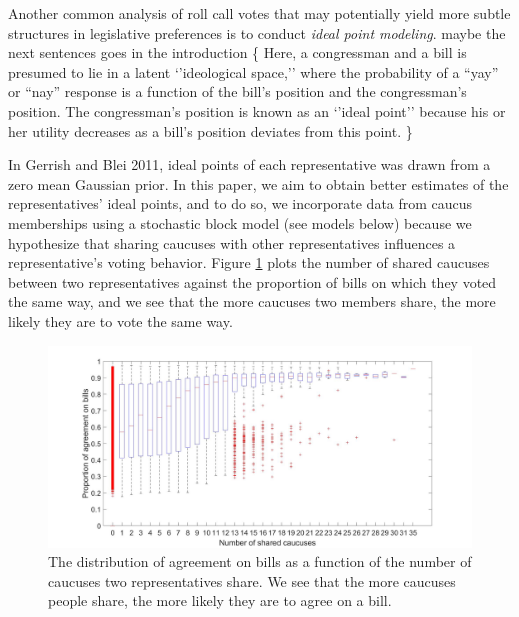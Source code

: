 \documentclass{article}
\begin{document}
Another common analysis of roll call votes that may potentially yield more subtle structures in legislative preferences is to conduct {\itshape ideal point modeling}. {\color{red} maybe the next sentences goes in the introduction \{} Here, a congressman and a bill is presumed to lie in a latent `'ideological space,'' where the probability of a ``yay'' or ``nay'' response is a function of the bill's position and the congressman's position. The congressman's position is known as an `'ideal point'' because his or her utility decreases as a bill's position deviates from this point. {\color{red} \}}

In Gerrish and Blei 2011, ideal points of each representative was drawn from a zero mean Gaussian prior. In this paper, we aim to obtain better estimates of the representatives' ideal points, and to do so, we incorporate data from caucus memberships using a stochastic block model (see models below) because we hypothesize that sharing caucuses with other representatives influences a representative's voting behavior. Figure \ref{fig:VotesVsCaucus} plots the number of shared caucuses between two representatives against the proportion of bills on which they voted the same way, and we see that the more caucuses two members share, the more likely they are to vote the same way. 

\begin{figure}[h]
  \centering
        \includegraphics[width=\textwidth]{Caucus_vs_Votes.jpg}
  \caption{The distribution of agreement on bills as a function of the number of caucuses two representatives share. We see that the more caucuses people share, the more likely they are to agree on a bill. }
          \label{fig:VotesVsCaucus}
\end{figure}
\end{document}
